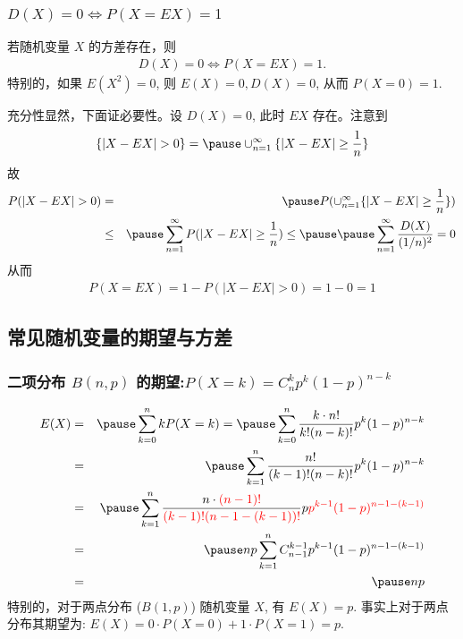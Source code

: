 \documentclass[Prob-All.tex]{subfiles}
\begin{document}
	\begin{frame}
		\frametitle{$D(X)=0\Leftrightarrow P(X=EX)=1$}
		\begin{thm}\label{sec:var0}
			若随机变量 $X$ 的方差存在，则
			\begin{eqnarray*}
				D(X)=0\Leftrightarrow P(X=EX)=1.
			\end{eqnarray*}
			特别的，如果 $E (X^2)=0$, 则 $E (X)=0,D (X)=0$, 从而 $P (X=0)=1$.
		\end{thm}

		\pause \zheng 充分性显然，下面证必要性。设 $D (X)=0$, 此时 $EX$ 存在。注意到
		\begin{eqnarray*}
			\{|X-EX|>0\}=\pause \cup_{n=1}^\infty \{|X-EX|\ge \dfrac{1}{n}\}
		\end{eqnarray*}
		\pause 故
		\begin{eqnarray*}
			P(|X-EX|>0)&=&\pause P(\cup_{n=1}^\infty \{|X-EX|\ge \dfrac{1}{n}\})\\
			&\le &\pause \sum_{n=1}^{\infty}P(|X-EX|\ge \dfrac{1}{n})\le\pause \pause \sum_{n=1}^{\infty}\dfrac{D(X)}{(1/n)^2}=0
		\end{eqnarray*}
		\pause 从而
		\begin{eqnarray*}
			P(X=EX)=1-P(|X-EX|>0)=1-0=1
		\end{eqnarray*}



	\end{frame}




	\subsection{常见随机变量的期望与方差}
	\begin{frame}
		\frametitle{二项分布 $B (n,p)$ 的期望:$P (X=k)=C_n^kp^k (1-p)^{n-k}$}
			\begin{eqnarray*}
				E(X)&=&\pause \sum_{k=0}^nkP(X=k)=\pause \sum_{k=0}^n\dfrac{k\cdot n!}{k!(n-k)!}p^k(1-p)^{n-k}\\
				&=&\pause \sum_{k=1}^{n}\dfrac{n!}{(k-1)!(n-k)!}p^k(1-p)^{n-k}\\
				&=&\pause \sum_{k=1}^{n}\dfrac{n\cdot \textcolor{red}{(n-1)!}}{\textcolor{red}{(k-1)!(n-1-(k-1))!}}p \textcolor{red}{p^{k-1}(1-p)^{n-1-(k-1)}}\\
				&=&\pause np\sum_{k=1}^nC_{n-1}^{k-1}p^{k-1}(1-p)^{n-1-(k-1)}\\
				&=&\pause np
			\end{eqnarray*}
			\pause 特别的，对于两点分布 ($B (1,p)$) 随机变量 $X$, 有 $E (X)=p$. \pause 事实上对于两点分布其期望为: $E (X)=0\cdot P (X=0)+1\cdot P (X=1)=p$.
	\end{frame}
\end{document}
